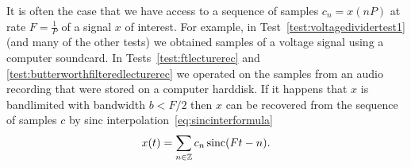 

It is often the case that we have access to a sequence of samples $c_n = x(nP)$ at rate $F = \tfrac{1}{P}$ of a signal $x$ of interest.  For example, in Test~\ref{test:voltagedividertest1} (and many of the other tests) we obtained samples of a voltage signal using a computer soundcard.  In Tests~\ref{test:ftlecturerec} and \ref{test:butterworthfilteredlecturerec} we operated on the samples from an audio recording that were stored on a computer harddisk.  If it happens that $x$ is bandlimited with bandwidth $b < F/2$ then $x$ can be recovered from the sequence of samples $c$ by sinc interpolation~\eqref{eq:sincinterformula}
 \[
  x(t) = \sum_{n \in {\mathbb Z}} c_n \operatorname{sinc}(F t - n).
  \]


